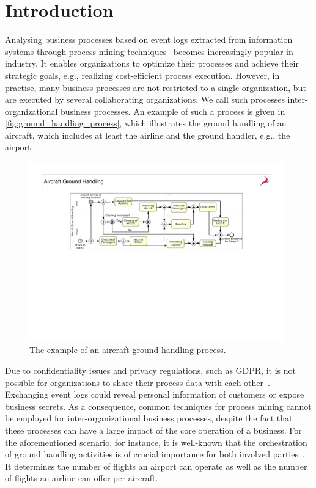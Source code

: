 
\section{Introduction}

Analysing business processes based on event logs extracted from information 
systems through process mining techniques~\cite{Aalst16} becomes increasingly 
popular in industry. It enables organizations to optimize their processes and 
achieve their strategic goals, e.g., realizing cost-efficient process 
execution. However, 
in practise, many business processes are not restricted to a single 
organization, but are executed by several collaborating organizations. 
We call such processes inter-organizational business processes.
An example of such a process is given in  
\autoref{fig:ground_handling_process}, which illustrates the ground handling of 
an aircraft, which includes at least the 
airline and the ground handler, e.g., the airport. 

\begin{figure}[t!]
	\centering
	\includegraphics[width=0.98\textwidth]{figures/aircraft_ground_handling_process}
	\caption{The example of an aircraft ground handling process.}
	\label{fig:ground_handling_process}	
	\vspace{-.6em}
\end{figure}


Due to confidentiality issues and privacy regulations, such as GDPR, it is not 
possible for organizations to share their process data with each 
other~\cite{gdpr}. 
Exchanging event logs could reveal personal information of customers or expose 
business secrets. As a consequence, common techniques for process mining cannot 
be employed for inter-organizational business processes, despite the fact that 
these processes can have a large impact of the core operation of a business.
For the aforementioned scenario, for instance, it is well-known that the 
orchestration of ground handling activities is of crucial importance for both 
involved parties~\cite{schmidberger2009ground}. It determines the number of 
flights an airport can operate as well as the number of flights an airline can 
offer per aircraft. 

